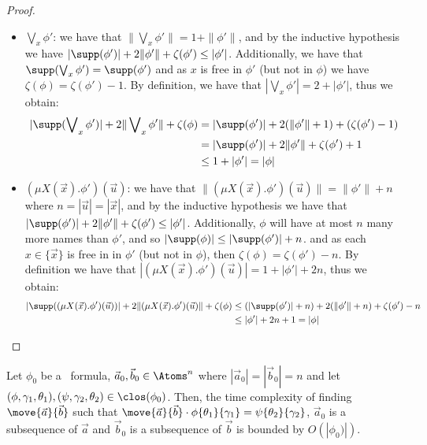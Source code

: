 \begin{proof}
\begin{itemize}
		By definition, we have that $|\diam{t, \vec u} \phi'| = 1 + |\vec u| + |\phi'|$, thus we obtain:
		\begin{align*}
			|\supp(\diam{t, \vec u} \phi')| + 2\|\diam{t, \vec u} \phi'\| + \zeta(\phi) 
			&= |\supp(\phi')| + 2\|\phi'\| + \zeta(\phi') + |\vec u|\\
			&\le 1 + |\phi'| + |\vec u| = |\phi|
		\end{align*}
		Similar can be shown for the case of $\fresh{x}\phi'$.
				\item $\bigvee\nolimits_x \phi'$: we have that $\|\bigvee\nolimits_x \phi'\| = 1 + \|\phi'\|$, and by the inductive hypothesis we have $|\supp(\phi')| + 2\|\phi'\| + \zeta(\phi') \le |\phi'|$.
		Additionally, we have that $\supp(\bigvee\nolimits_x \phi') = \supp(\phi')$ and as $x$ is free in $\phi'$ (but not in $\phi$) we have $\zeta(\phi) = \zeta(\phi') - 1$.
		By definition, we have that $|\bigvee\nolimits_x \phi'| = 2 + |\phi'|$, thus we obtain:
		\begin{align*}
			|\supp(\bigvee\nolimits_x \phi')| + 2\|\bigvee\nolimits_x  \phi'\| + \zeta(\phi) &= |\supp(\phi')| + 2(\|\phi'\| + 1) + (\zeta(\phi') - 1)\\
			&= |\supp(\phi')| + 2\|\phi'\| + \zeta(\phi') + 1\\
			&\le 1 + |\phi'| = |\phi|  
		\end{align*}
				\item $(\mu X(\vec x).\phi')(\vec u)$: we have that $\|(\mu X(\vec x).\phi')(\vec u)\| = \|\phi'\| + n$ where $n = |\vec u| = |\vec x|$, and by the inductive hypothesis we have that $|\supp(\phi')| + 2\|\phi'\| + \zeta(\phi') \le |\phi'|$. 
		Additionally, $\phi$ will have at most $n$ many more names than $\phi'$, and so $|\supp(\phi)| \le |\supp(\phi')| + n$. 
				and as each $x \in \{\vec x\}$ is free in in $\phi'$ (but not in $\phi$), then $\zeta(\phi) = \zeta(\phi') - n$.
		By definition we have that $|(\mu X(\vec x).\phi')(\vec u)| = 1 + |\phi'| + 2n$, thus we obtain:
		\begin{align*}
			|\supp((\mu X(\vec x).\phi')(\vec u))| + 2\|(\mu X(\vec x).\phi')(\vec u)\| + \zeta(\phi)
			&\le (|\supp(\phi')| + n) + 2(\|\phi'\| + n) + \zeta(\phi') - n\\
						&\le |\phi'| + 2n + 1 = |\phi|\ 
		\end{align*}
	\end{itemize}
\end{proof}


\begin{lemma}\label{lem:genPartialPermF}
	Let $\phi_0$ be a \fhml\ formula, $\vec a_0, \vec b_0 \in \Atoms^{n}$ where $|\vec a_0| = |\vec b_0| = n$ and let $(\phi, \gamma_1, \theta_1), (\psi, \gamma_2, \theta_2) \in \clos(\phi_0)$.
	Then, the time complexity of finding $\move{\vec a}{\vec b}$ 
	such that $\move{\vec a}{\vec b} \cdot \phi\{\theta_1\}\{\gamma_1\} = \psi\{\theta_2\}\{\gamma_2\}$, $\vec a_0$ is a subsequence of $\vec a$ and $\vec b_0$ is a subsequence of $\vec b$ is bounded by $O(|\phi_0)|)$.
\end{lemma}

